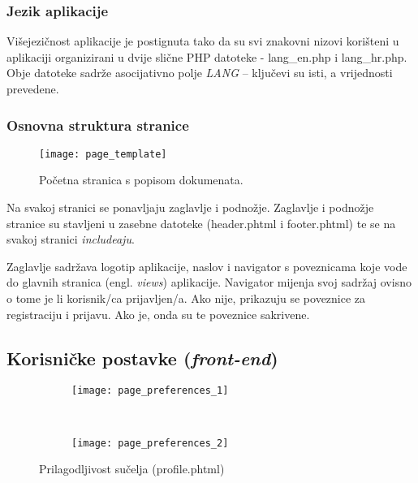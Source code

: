       

      \subsubsection{Jezik aplikacije}

        Višejezičnost aplikacije je postignuta tako da su svi znakovni nizovi
        korišteni u aplikaciji organizirani u dvije slične PHP datoteke -
        lang\_en.php i lang\_hr.php. Obje datoteke sadrže asocijativno polje
        \textit{LANG} -- ključevi su isti, a vrijednosti prevedene.

        

        

    \subsubsection{Osnovna struktura stranice}

    \begin{figure}[h]
      \texttt{[image: page\_template]}
      \caption{Početna stranica s popisom dokumenata.}
    \end{figure}

    Na svakoj stranici se ponavljaju zaglavlje i podnožje. Zaglavlje i podnožje
    stranice su stavljeni u zasebne datoteke (header.phtml i footer.phtml) te se
    na svakoj stranici \textit{includeaju}.

    Zaglavlje sadržava logotip aplikacije, naslov i navigator s poveznicama koje
    vode do glavnih stranica (engl. \textit{views}) aplikacije. Navigator
    mijenja svoj sadržaj ovisno o tome je li korisnik/ca prijavljen/a. Ako nije,
    prikazuju se poveznice za registraciju i prijavu. Ako je, onda su te
    poveznice sakrivene.

    \subsection{Korisničke postavke (\textit{front-end})}

      \begin{figure}[h]
        \begin{center}
          \begin{subfigure}{0.65\textwidth}
            \texttt{[image: page\_preferences\_1]}
          \end{subfigure}
          \\
          \begin{subfigure}{0.65\textwidth}
            \texttt{[image: page\_preferences\_2]}
          \end{subfigure}

          \caption{Prilagodljivost sučelja (profile.phtml)}
        \end{center}
      \end{figure}

